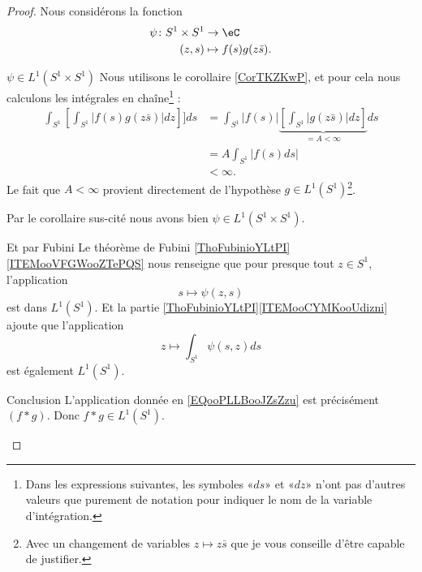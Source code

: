 \begin{proof}
    Nous considérons la fonction
    \begin{equation}
        \begin{aligned}
            \psi\colon S^1\times S^1&\to \eC \\
            (z,s)&\mapsto f(s)g(z\bar s). 
        \end{aligned}
    \end{equation}
    \begin{subproof}
    \item[\( \psi\in L^1(S^1\times S^1)\)]
        Nous utilisons le corollaire \ref{CorTKZKwP}, et pour cela nous calculons les intégrales en chaîne\footnote{Dans les expressions suivantes, les symboles «\( ds\)» et «\( dz\)» n'ont pas d'autres valeurs que purement de notation pour indiquer le nom de la variable d'intégration.} :
        \begin{subequations}
            \begin{align}
                \int_{S^1}\left[ \int_{S^1}| f(s)g(z\bar s) |dz \right]]ds&=\int_{S^1}| f(s) |\underbrace{\left[ \int_{S^1}| g(z\bar s) |dz \right]}_{=A<\infty}ds\\
                &=A\int_{S^1}| f(s)ds |\\
                &<\infty.
            \end{align}
        \end{subequations}
        Le fait que \( A<\infty\) provient directement de l'hypothèse \( g\in L^1(S^1)\)\footnote{Avec un changement de variables \( z\mapsto z\bar s\) que je vous conseille d'être capable de justifier.}.
        
        Par le corollaire sus-cité nous avons bien \( \psi\in L^1(S^1\times S^1)\).
    \item[Et par Fubini]
        Le théorème de Fubini \ref{ThoFubinioYLtPI}\ref{ITEMooVFGWooZTePQS} nous renseigne que pour presque tout \( z\in S^1\), l'application
        \begin{equation}
            s\mapsto \psi(z,s)
        \end{equation}
        est dans \( L^1(S^1)\). Et la partie \ref{ThoFubinioYLtPI}\ref{ITEMooCYMKooUdizni} ajoute que l'application
        \begin{equation}        \label{EQooPLLBooJZsZzu}
            z\mapsto \int_{S^1}\psi(s,z)ds
        \end{equation}
        est également \( L^1(S^1)\).
    \item[Conclusion]
        L'application donnée en \eqref{EQooPLLBooJZsZzu} est précisément \( (f*g)\). Donc \( f*g\in L^1(S^1)\).
    \end{subproof}
\end{proof}

